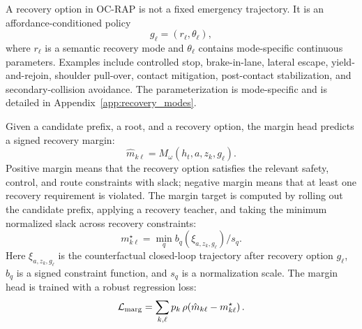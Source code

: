 \documentclass[conference]{IEEEtran}
\begin{document}
A recovery option in OC-RAP is not a fixed emergency trajectory.  It is an affordance-conditioned policy
\begin{equation}
    g_\ell = (r_\ell,\theta_\ell),
\end{equation}
where $r_\ell$ is a semantic recovery mode and $\theta_\ell$ contains mode-specific continuous parameters.  Examples include controlled stop, brake-in-lane, lateral escape, yield-and-rejoin, shoulder pull-over, contact mitigation, post-contact stabilization, and secondary-collision avoidance.  The parameterization is mode-specific and is detailed in Appendix~\ref{app:recovery_modes}.

Given a candidate prefix, a root, and a recovery option, the margin head predicts a signed recovery margin:
\begin{equation}
    \hat m_{k\ell}
    =
    M_\omega(h_t,a,z_k,g_\ell).
    \label{eq:margin_head}
\end{equation}
Positive margin means that the recovery option satisfies the relevant safety, control, and route constraints with slack; negative margin means that at least one recovery requirement is violated.  The margin target is computed by rolling out the candidate prefix, applying a recovery teacher, and taking the minimum normalized slack across recovery constraints:
\begin{equation}
    m^{\star}_{k\ell}
    =
    \min_q b_q(\xi_{a,z_k,g_\ell})/s_q.
    \label{eq:signed_margin}
\end{equation}
Here $\xi_{a,z_k,g_\ell}$ is the counterfactual closed-loop trajectory after recovery option $g_\ell$, $b_q$ is a signed constraint function, and $s_q$ is a normalization scale.  The margin head is trained with a robust regression loss:
\begin{equation}
    \mathcal{L}_{\rm marg}
    =
    \sum_{k,\ell}
    p_k \,
    \rho\!\left(\hat m_{k\ell}-m^{\star}_{k\ell}\right).
    \label{eq:margin_loss}
\end{equation}
\end{document}
